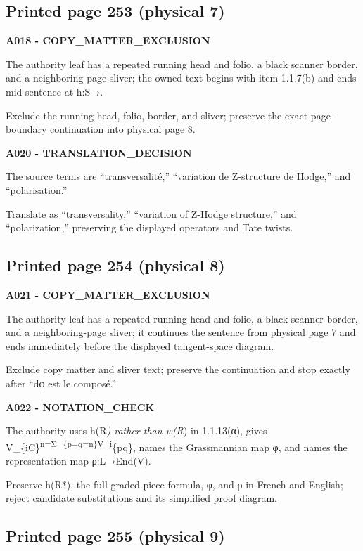 \documentclass[10pt,a4paper]{article}
\begin{document}
\subsection{Printed page 253 (physical 7)}

\textbf{A018 - COPY\_MATTER\_EXCLUSION}

The authority leaf has a repeated running head and folio, a black scanner border, and a neighboring-page sliver; the owned text begins with item 1.1.7(b) and ends mid-sentence at h:S→.

Exclude the running head, folio, border, and sliver; preserve the exact page-boundary continuation into physical page 8.

\textbf{A020 - TRANSLATION\_DECISION}

The source terms are ``transversalité,'' ``variation de Z-structure de Hodge,'' and ``polarisation.''

Translate as ``transversality,'' ``variation of Z-Hodge structure,'' and ``polarization,'' preserving the displayed operators and Tate twists.

\subsection{Printed page 254 (physical 8)}

\textbf{A021 - COPY\_MATTER\_EXCLUSION}

The authority leaf has a repeated running head and folio, a black scanner border, and a neighboring-page sliver; it continues the sentence from physical page 7 and ends immediately before the displayed tangent-space diagram.

Exclude copy matter and sliver text; preserve the continuation and stop exactly after ``dφ est le composé.''

\textbf{A022 - NOTATION\_CHECK}

The authority uses h(R\emph{) rather than w(R}) in 1.1.13(α), gives V\_\{iC\}\textsuperscript{n=Σ\_\{p+q=n\}V\_i}\{pq\}, names the Grassmannian map φ, and names the representation map ρ:L→End(V).

Preserve h(R*), the full graded-piece formula, φ, and ρ in French and English; reject candidate substitutions and its simplified proof diagram.

\subsection{Printed page 255 (physical 9)}
\end{document}
